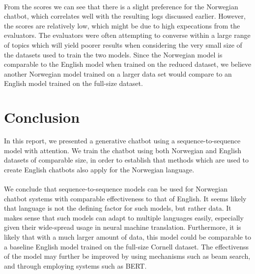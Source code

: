 \documentclass{article}
\begin{document}
\paragraph{}
From the scores we can see that there is a slight preference for the Norwegian
chatbot, which correlates well with the resulting logs discussed earlier.
However, the scores are relatively low, which might be due to high expecations
from the evaluators. The evaluators were often attempting to converse within
a large range of topics which will yield poorer results when considering the
very small size of the datasets used to train the two models. Since the
Norwegian model is comparable to the English model when trained on the reduced
dataset, we believe another Norwegian model trained on a larger data set would
compare to an English model trained on the full-size dataset.

\section*{Conclusion}

In this report, we presented a generative chatbot using a
sequence-to-sequence model with attention. We train the chatbot using both
Norwegian and English datasets of comparable size, in order to establish that
methods which are used to create English chatbots also apply for the Norwegian
language.

\paragraph{}
We conclude that sequence-to-sequence models can be used for Norwegian chatbot
systems with comparable effectiveness to that of English. It seems likely that
language is not the defining factor for such models, but rather data. It makes
sense that such models can adapt to multiple languages easily, especially
given their wide-spread usage in neural machine translation. Furthermore, it
is likely that with a much larger amount of data, this model could be
comparable to a baseline English model trained on the full-size Cornell
dataset. The effectivenss of the model may further be improved by using
mechanisms such as beam search, and through employing systems such as BERT.

\printbibliography
\end{document}
